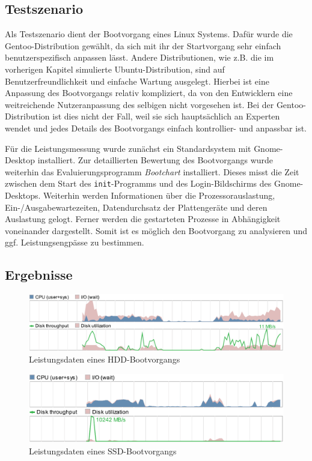 \subsection{Testszenario}

Als Testszenario dient der Bootvorgang eines Linux Systems. Dafür wurde die Gentoo-Distribution gewählt, da sich mit ihr der Startvorgang sehr einfach
benutzerspezifisch anpassen lässt. Andere Distributionen, wie z.B. die im vorherigen Kapitel simulierte Ubuntu-Distribution, sind auf Benutzerfreundlichkeit und
einfache Wartung ausgelegt. Hierbei ist eine Anpassung des Bootvorgangs relativ kompliziert, da von den Entwicklern eine weitreichende Nutzeranpassung des
selbigen nicht vorgesehen ist. Bei der Gentoo-Distribution ist dies nicht der Fall, weil sie sich hauptsächlich an Experten wendet und jedes Details des
Bootvorgangs einfach kontrollier- und anpassbar ist.

Für die Leistungsmessung wurde zunächst ein Standardsystem mit Gnome-Desktop installiert. Zur detaillierten Bewertung des Bootvorgangs wurde weiterhin das
Evaluierungsprogramm \textit{Bootchart} \cite{bootchart} installiert. Dieses misst die Zeit zwischen dem Start des \texttt{init}-Programms und des
Login-Bildschirms des Gnome-Desktops. Weiterhin werden Informationen über die Prozessorauslastung, Ein-/Ausgabewartezeiten, Datendurchsatz der Plattengeräte und
deren Auslastung gelogt. Ferner werden die gestarteten Prozesse in Abhängigkeit voneinander dargestellt. Somit ist es möglich den Bootvorgang zu analysieren
und ggf. Leistungsengpässe zu bestimmen.

\subsection{Ergebnisse}

\begin{figure}[b!]
    \includegraphics[scale=0.543]{figures/chapter7/boot-hdd}%
    \caption{Leistungsdaten eines HDD-Bootvorgangs}
    \label{img:boot:hdd}
\end{figure}

\begin{figure}[b!]
    \includegraphics[scale=0.543]{figures/chapter7/boot-ssd}%
    \caption{Leistungsdaten eines SSD-Bootvorgangs}
    \label{img:boot:ssd}
\end{figure}

